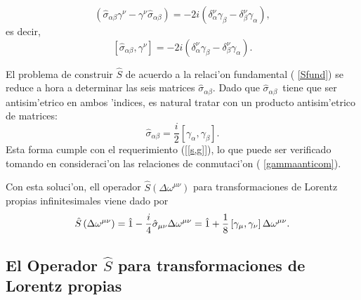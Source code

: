 \begin{equation}
 \left( \hat{\sigma}_{\alpha \beta }\gamma^\nu -\gamma^\nu \hat{\sigma}_{\alpha
\beta }\right) =-2i\left( \delta_\alpha^\nu \gamma _{\beta}-\delta_\beta^\nu
\gamma _{\alpha }\right) , 
\end{equation} 
es decir,
\begin{equation}
 \left[ \hat{\sigma}_{\alpha \beta },\gamma^\nu \right]=-2i\left(
\delta_\alpha^\nu \gamma _{\beta }-\delta_\beta^\nu \gamma _{\alpha}\right) .
\label{[s,g]}
\end{equation} 

El problema de construir $\hat{S}$ de acuerdo a la relaci'on fundamental (%
\ref{Sfund}) se reduce a hora a determinar las seis matrices $\hat{\sigma}%
_{\alpha \beta }$. Dado que $\hat{\sigma}_{\alpha \beta }$\ tiene que ser
antisim'etrico en ambos 'indices, es natural tratar con un producto
antisim'etrico de matrices: 
\begin{equation}
\hat{\sigma}_{\alpha \beta }=\frac{i}{2}\left[ \gamma _{\alpha },\gamma
_{\beta }\right] . \label{sab}
\end{equation}
Esta forma cumple con el requerimiento (\ref{[s,g]}), lo que puede ser
verificado tomando en consideraci'on las relaciones de conmutaci'on (%
\ref{gammaanticom}). 


Con esta soluci'on, ell operador $\hat{S}\left( \Delta \omega
^{\mu \nu }\right) $ para transformaciones de Lorentz propias
infinitesimales viene dado por
\begin{equation}
\hat{S}\left( \Delta \omega^{\mu \nu }\right) =\hat{1}-\frac{i}{4}\hat{%
\sigma}_{\mu \nu }\Delta \omega^{\mu \nu }=\hat{1}+\frac{1}{8}\left[
\gamma _{\mu },\gamma _\nu \right] \Delta \omega^{\mu \nu }.
\label{S(dw)}
\end{equation}

\subsection{El Operador $\hat{S}$ para transformaciones de Lorentz propias}

